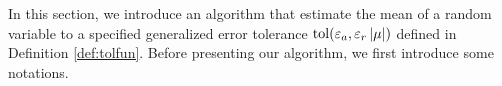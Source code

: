 \documentclass{iitthesis}
\theoremstyle{definition}
\begin{document}
\label{sec:algmeanMCg}

In this section, we introduce an algorithm that estimate the mean of a random variable to a specified generalized error tolerance $\operatorname{tol}(\varepsilon_a, \varepsilon_r\left \lvert \mu \right \rvert)$ defined in Definition \ref{def:tolfun}. Before presenting our algorithm, we first introduce some notations. 
\end{document}
